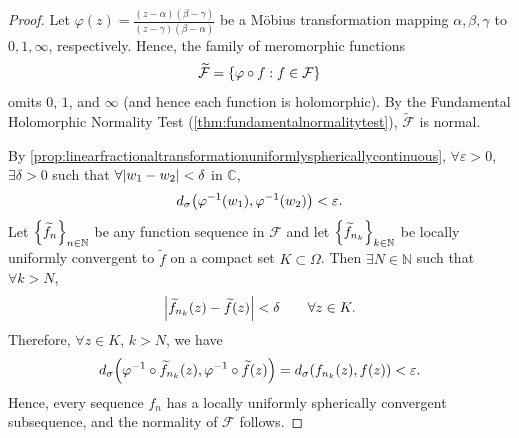 \begin{proof}
    Let \(\varphi(z)=\frac{(z-\alpha)(\beta-\gamma)}{(z-\gamma)(\beta-\alpha)}\) be a Möbius transformation mapping \(\alpha,\beta,\gamma\) to \(0,1,\infty\), respectively.
    Hence, the family of meromorphic functions \[\widetilde{\mathcal{F}}=\cbraces{\varphi\circ f}{f\in\mathcal{F}}\] omits \(0\), \(1\), and \(\infty\) (and hence each function is holomorphic). By the Fundamental Holomorphic Normality Test (\cref{thm:fundamentalnormalitytest}), \(\widetilde{\mathcal{F}}\) is normal.

    By \cref{prop:linearfractionaltransformationuniformlysphericallycontinuous}, \(\forall\varepsilon>0\), \(\exists\delta>0\) such that \(\forall\abs{w_1-w_2}<\delta\) in \(\mathbb{C}\), \[d_\sigma\qty(\varphi^{-1}\qty(w_1),\varphi^{-1}\qty(w_2))<\varepsilon.\]
    Let \(\cbraces{\widetilde{f}_n}_{n\in\mathbb{N}}\) be any function sequence in \(\mathcal{F}\) and let \(\cbraces{\widetilde{f}_{n_k}}_{k\in\mathbb{N}}\) be locally uniformly convergent to \(\widetilde{f}\) on a compact set \(K\subset\Omega\). Then \(\exists N\in\mathbb{N}\) such that \(\forall k>N\), \[\abs{\widetilde{f}_{n_k}(z)-\widetilde{f}(z)}<\delta\qquad\forall z\in K.\]
    Therefore, \(\forall z\in K\), \(k>N\), we have \[d_\sigma\qty(\varphi^{-1}\circ\widetilde{f}_{n_k}(z),\varphi^{-1}\circ\widetilde{f}(z))=d_\sigma\qty(f_{n_k}(z),f(z))<\varepsilon.\] Hence, every sequence \(f_n\) has a locally uniformly spherically convergent subsequence, and the normality of \(\mathcal{F}\) follows.
\end{proof}
